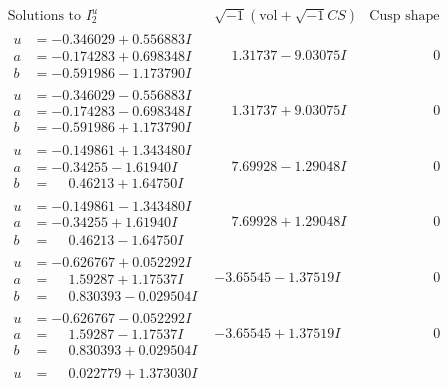 \documentclass[1p]{elsarticle_modified}
\theoremstyle{definition}
\newcommand{\I}{\sqrt{-1}}
\begin{document}
$$\begin{array}{c|c|c}
\text{Solutions to }I^u_{2}& \I (\text{vol} + \sqrt{-1}CS) & \text{Cusp shape}\\
 \hline 
\begin{aligned}
u &= -0.346029 + 0.556883 I \\
a &= -0.174283 + 0.698348 I \\
b &= -0.591986 - 1.173790 I\end{aligned}
 & \phantom{-}1.31737 - 9.03075 I & \phantom{-0.000000 } 0 \\ \hline\begin{aligned}
u &= -0.346029 - 0.556883 I \\
a &= -0.174283 - 0.698348 I \\
b &= -0.591986 + 1.173790 I\end{aligned}
 & \phantom{-}1.31737 + 9.03075 I & \phantom{-0.000000 } 0 \\ \hline\begin{aligned}
u &= -0.149861 + 1.343480 I \\
a &= -0.34255 - 1.61940 I \\
b &= \phantom{-}0.46213 + 1.64750 I\end{aligned}
 & \phantom{-}7.69928 - 1.29048 I & \phantom{-0.000000 } 0 \\ \hline\begin{aligned}
u &= -0.149861 - 1.343480 I \\
a &= -0.34255 + 1.61940 I \\
b &= \phantom{-}0.46213 - 1.64750 I\end{aligned}
 & \phantom{-}7.69928 + 1.29048 I & \phantom{-0.000000 } 0 \\ \hline\begin{aligned}
u &= -0.626767 + 0.052292 I \\
a &= \phantom{-}1.59287 + 1.17537 I \\
b &= \phantom{-}0.830393 - 0.029504 I\end{aligned}
 & -3.65545 - 1.37519 I & \phantom{-0.000000 } 0 \\ \hline\begin{aligned}
u &= -0.626767 - 0.052292 I \\
a &= \phantom{-}1.59287 - 1.17537 I \\
b &= \phantom{-}0.830393 + 0.029504 I\end{aligned}
 & -3.65545 + 1.37519 I & \phantom{-0.000000 } 0 \\ \hline\begin{aligned}
u &= \phantom{-}0.022779 + 1.373030 I \\

\end{aligned}
\end{array}$$
\end{document}
